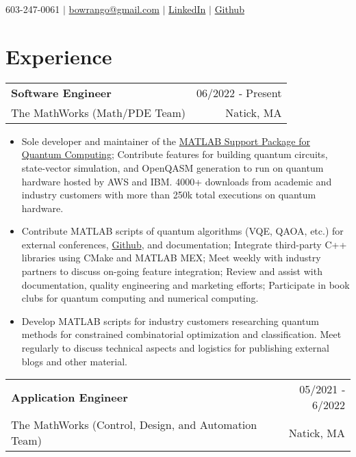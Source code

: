 \documentclass[11pt,a4paper,sans]{moderncv}
\makeatletter
\newcommand{\role}[4]{
  \vspace{0cm}
    \begin{tabular*}{1\textwidth}[t]{l@{\extracolsep{\fill}}r}
      \textbf{#1} & #2 \\ #3 & #4
    \end{tabular*}
    \vspace{-0.3cm}
}
\makeatother
\begin{document}
\makecvtitle
\vspace{-1.5cm}
\begin{center}
    603-247-0061 $|$ 
    \href{mailto:bowrango@gmail.com}{bowrango@gmail.com} $|$ 
    \color{blue} \href{https://www.linkedin.com/in/matt-bowring-463610149/}{LinkedIn} $|$
    \color{blue} \href{https://github.com/bowrango}{Github}
\end{center}
\vspace{-1cm}

\section{Experience}

\role
      {Software Engineer}{06/2022 ‐ Present}
      {The MathWorks (Math/PDE Team)}{Natick, MA}

{\begin{itemize}[leftmargin=0.5cm, label={\textbullet}]

\item Sole developer and maintainer of the {{\color{blue}\href{https://www.mathworks.com/help/matlab/quantum-computing.html?s_tid=CRUX_lftnav}{MATLAB Support Package for Quantum Computing}}}; Contribute features for building quantum circuits, state-vector simulation, and OpenQASM generation to run on quantum hardware hosted by AWS and IBM. 4000+ downloads from academic and industry customers with more than 250k total executions on quantum hardware.

\item Contribute MATLAB scripts of quantum algorithms (VQE, QAOA, etc.) for external conferences, {{\color{blue}\href{https://github.com/mathworks/Quantum-Computing-MATLAB}{Github}}}, and documentation; Integrate third-party C++ libraries using CMake and MATLAB MEX; Meet weekly with industry partners to discuss on-going feature integration; Review and assist with documentation, quality engineering and marketing efforts; Participate in book clubs for quantum computing and numerical computing. 

\item Develop MATLAB scripts for industry customers researching quantum methods for constrained combinatorial optimization and classification. Meet regularly to discuss technical aspects and logistics for publishing external blogs and other material.

\end{itemize}}

\role
      {Application Engineer}{05/2021 ‐ 6/2022}
      {The MathWorks (Control, Design, and Automation Team)}{Natick, MA}
\end{document}
